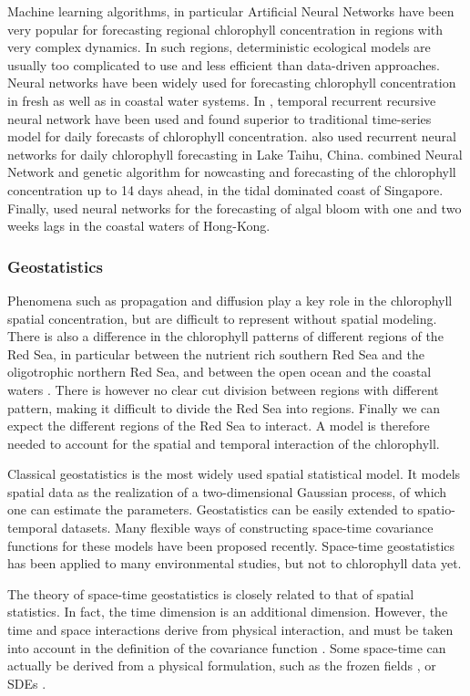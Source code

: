 Machine learning algorithms, in particular Artificial Neural Networks have been very popular for forecasting regional chlorophyll concentration in regions with very complex dynamics. In such regions, deterministic ecological models are usually too complicated to use and less efficient than data-driven approaches. Neural networks have been widely used for forecasting chlorophyll concentration in fresh as well as in coastal water systems. In \cite{Jeong2006}, temporal recurrent recursive neural network have been used and found superior to traditional time-series model for daily forecasts of chlorophyll concentration. \cite{Wang2013} also used recurrent neural networks for daily chlorophyll forecasting in Lake Taihu, China. \cite{Mulia2013} combined Neural Network and genetic algorithm for nowcasting and forecasting of the chlorophyll concentration up to 14 days ahead, in the tidal dominated coast of Singapore. Finally, \cite{Lee2013} used neural networks for the forecasting of algal bloom with one and two weeks lags in the coastal waters of Hong-Kong.
\subsubsection{Geostatistics}

Phenomena such as propagation and diffusion play a key role in the chlorophyll spatial concentration, but are difficult to represent without spatial modeling. There is also a difference in the chlorophyll patterns of different regions of the Red Sea, in particular between the nutrient rich southern Red Sea and the oligotrophic northern Red Sea, and between the open ocean and the coastal waters \cite{Raitsos2013}. There is however no clear cut division between regions with different pattern, making it difficult to divide the Red Sea into regions. Finally we can expect the different regions of the Red Sea to interact. A model is therefore needed to account for the spatial and temporal interaction of the chlorophyll.

Classical geostatistics is the most widely used spatial statistical model. It models spatial data as the realization of a two-dimensional Gaussian process, of which one can estimate the parameters. Geostatistics can be easily extended to spatio-temporal datasets. Many flexible ways of constructing space-time covariance functions for these models have been proposed recently. Space-time geostatistics has been applied to many environmental studies, but not to chlorophyll data yet.

The theory of space-time geostatistics is closely related to that of spatial statistics. In fact, the time dimension is an additional dimension. However, the time and space interactions derive from physical interaction, and must be taken into account in the definition of the covariance function \cite{Gneiting2010}. Some space-time can actually be derived from a physical formulation, such as the frozen fields \cite{Gneiting2010}, or SDEs \cite{Brown2000, North2011}.

